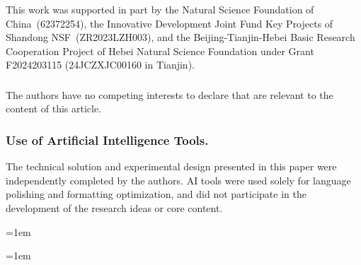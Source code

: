 \documentclass[runningheads]{llncs}
\begin{document}
\begin{credits}
\subsubsection{\ackname}
This work was supported in part by the Natural Science Foundation of
China~(62372254), the Innovative Development Joint Fund Key Projects of
Shandong NSF~(ZR2023LZH003), and the Beijing-Tianjin-Hebei Basic Research
Cooperation Project of Hebei Natural Science Foundation under Grant
F2024203115\allowbreak{} (24JCZXJC00160 in Tianjin).

\subsubsection{\discintname}
The authors have no competing interests to declare that are relevant to the content of this article.

\subsubsection{Use of Artificial Intelligence Tools.}
The technical solution and experimental design presented in this paper were independently completed by the authors. AI tools were used solely for language polishing and
formatting optimization, and did not participate in the development of the research ideas or core content.
\end{credits}


\begingroup
\sloppy
\raggedright
\emergencystretch=1em


\endgroup

\emergencystretch=1em
\end{document}
